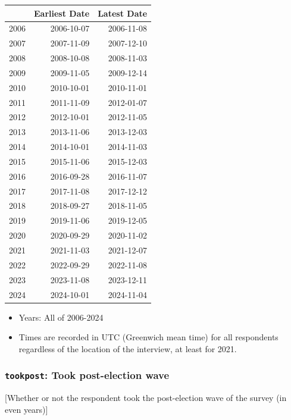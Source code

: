 \documentclass[10pt,article,oneside]{memoir}
\begin{document}
\begin{table}
\centering
\begin{tabular}{lrr}
\toprule
 & Earliest Date & Latest Date\\
\midrule
2006 & 2006-10-07 & 2006-11-08\\
2007 & 2007-11-09 & 2007-12-10\\
2008 & 2008-10-08 & 2008-11-03\\
2009 & 2009-11-05 & 2009-12-14\\
2010 & 2010-10-01 & 2010-11-01\\
2011 & 2011-11-09 & 2012-01-07\\
2012 & 2012-10-01 & 2012-11-05\\
2013 & 2013-11-06 & 2013-12-03\\
2014 & 2014-10-01 & 2014-11-03\\
2015 & 2015-11-06 & 2015-12-03\\
2016 & 2016-09-28 & 2016-11-07\\
2017 & 2017-11-08 & 2017-12-12\\
2018 & 2018-09-27 & 2018-11-05\\
2019 & 2019-11-06 & 2019-12-05\\
2020 & 2020-09-29 & 2020-11-02\\
2021 & 2021-11-03 & 2021-12-07\\
2022 & 2022-09-29 & 2022-11-08\\
2023 & 2023-11-08 & 2023-12-11\\
2024 & 2024-10-01 & 2024-11-04\\
\bottomrule
\end{tabular}
\end{table}

\begin{itemize}
\tightlist
\item
  Years: All of 2006-2024
\item
  Times are recorded in UTC (Greenwich mean time) for all respondents
  regardless of the location of the interview, at least for 2021.
\end{itemize}

\subsubsection{\texorpdfstring{\texttt{tookpost}: Took post-election
wave}{tookpost: Took post-election wave}}\label{tookpost-took-post-election-wave}

{[}Whether or not the respondent took the post-election wave of the
survey (in even years){]}
\end{document}
